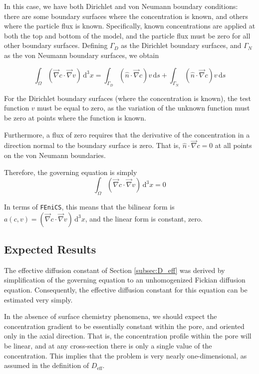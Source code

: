 In this case, we have both Dirichlet and von Neumann boundary conditions:
there are some boundary surfaces where the concentration is known,
and others where the particle flux is known.
Specifically, known concentrations are applied at both the top and bottom of the model,
and the particle flux must be zero for all other boundary surfaces.
Defining $\Gamma_D$ as the Dirichlet boundary surfaces,
and $\Gamma_N$ as the von Neumann boundary surfaces, we obtain

\begin{equation}
\int_{\Omega} \left( \vec{\nabla}c \cdot \vec{\nabla}v \right) \,\mathrm{d}^3x =
\int_{\Gamma_D} \left( \hat{n} \cdot \vec{\nabla} c \right) v\,\mathrm{d}s
+\int_{\Gamma_N} \left( \hat{n} \cdot \vec{\nabla} c \right) v\,\mathrm{d}s
\end{equation}

For the Dirichlet boundary surfaces (where the concentration is known),
the test function $v$ must be equal to zero,
as the variation of the unknown function must be zero at points where the function is known.

Furthermore, a flux of zero requires that the derivative of the concentration in a direction
normal to the boundary surface is zero.
That is, $\hat{n} \cdot \vec{\nabla} c = 0$ at all points on the von Neumann boundaries.

Therefore, the governing equation is simply
\begin{equation}
\int_{\Omega} \left( \vec{\nabla}c \cdot \vec{\nabla}v \right) \,\mathrm{d}^3x = 0
\end{equation}

In terms of \texttt{FEniCS}, this means that the bilinear form is
$a(c,v)=\left( \vec{\nabla}c \cdot \vec{\nabla}v \right) \,\mathrm{d}^3x$,
and the linear form is constant, zero.


\subsection{Expected Results}\label{subsec:unhom_fick_expected}

The effective diffusion constant of Section \ref{subsec:D_eff}
was derived by simplification of the governing equation
to an unhomogenized Fickian diffusion equation.
Consequently, the effective diffusion constant for this equation
can be estimated very simply.

In the absence of surface chemistry phenomena,
we should expect the concentration gradient
to be essentially constant within the pore, and oriented only in the axial direction.
That is, the concentration profile within the pore will be linear,
and at any cross-section there is only a single value of the concentration.
This implies that the problem is very nearly one-dimensional,
as assumed in the definition of $D_{\mathrm{eff}}$.

